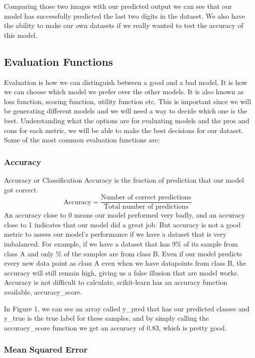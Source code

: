 \documentclass[a4paper,12pt]{report}
\begin{document}
Comparing those two images with our predicted output we can see that our model has successfully predicted the last two digits in the dataset. We also have the ability to make our own datasets if we really wanted to test the accuracy of this model.

\subsection{Evaluation Functions}

Evaluation is how we can distinguish between a good and a bad model. It is how we can choose which model we prefer over the other models. It is also known as loss function, scoring function, utility function etc. This is important since we will be generating different models and we will need a way to decide which one is the best. Understanding what the options are for evaluating models and the pros and cons for each metric, we will be able to make the best decisions for our dataset. Some of the most common evaluation functions are:

\subsubsection{Accuracy}

Accuracy or Classification Accuracy is the fraction of prediction that our model got correct.
$$\text{Accuracy}=\frac{\text{Number of correct predictions}}{\text{Total number of predictions}}$$
An accuracy close to 0 means our model performed very badly, and an accuracy close to 1 indicates that our model did a great job. But accuracy is not a good metric to assess our model’s performance if we have a dataset that is very imbalanced. For example, if we have a dataset that has 9\% of its sample from class A and only \% of the samples are from class B. Even if our model predicts every new data point as class A even when we have datapoints from class B, the accuracy will still remain high, giving us a false illusion that are model works. Accuracy is not difficult to calculate, scikit-learn has an accuracy function available, accuracy\_score.


In Figure 1, we can see an array called y\_pred that has our predicted classes and y\_true is the true label for these samples, and by simply calling the accuracy\_score function we get an accuracy of 0.83, which is pretty good.

\subsubsection{Mean Squared Error}
\end{document}
